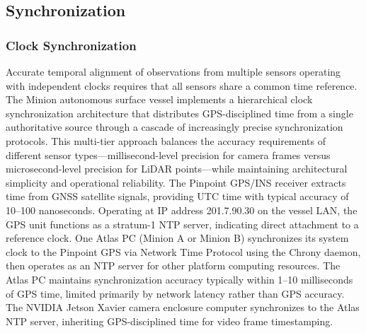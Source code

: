         \subsection{Synchronization} \label{sync}
        
            \subsubsection{Clock Synchronization} \label{clock_sync}

Accurate temporal alignment of observations from multiple sensors operating with independent clocks requires that all sensors share a common time reference. The Minion autonomous surface vessel implements a hierarchical clock synchronization architecture that distributes GPS-disciplined time from a single authoritative source through a cascade of increasingly precise synchronization protocols. This multi-tier approach balances the accuracy requirements of different sensor types---millisecond-level precision for camera frames versus microsecond-level precision for LiDAR points---while maintaining architectural simplicity and operational reliability.
The Pinpoint GPS/INS receiver extracts time from GNSS satellite signals, providing UTC time with typical accuracy of 10--100 nanoseconds. Operating at IP address 201.7.90.30 on the vessel LAN, the GPS unit functions as a stratum-1 \ac{NTP} server, indicating direct attachment to a reference clock. One Atlas PC (Minion A or Minion B) synchronizes its system clock to the Pinpoint GPS via Network Time Protocol using the Chrony daemon, then operates as an \ac{NTP} server for other platform computing resources. The Atlas PC maintains synchronization accuracy typically within 1--10 milliseconds of GPS time, limited primarily by network latency rather than GPS accuracy. The NVIDIA Jetson Xavier camera enclosure computer synchronizes to the Atlas \ac{NTP} server, inheriting GPS-disciplined time for video frame timestamping.

